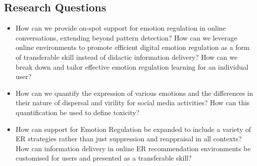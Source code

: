 \subsection{Research Questions}

\begin{itemize}
    \item How can we provide on-spot support for emotion regulation in online conversations, extending beyond pattern detection? How can we leverage online environments to promote efficient digital emotion regulation as a form of transferable skill instead of didactic information delivery? How can we break down and tailor effective emotion regulation learning for an individual user?
    \item How can we quantify the expression of various emotions and the differences in their nature of dispersal and virility for social media activities? How can this quantification be used to define toxicity?
    \item How can support for Emotion Regulation be expanded to include a variety of ER strategies rather than just suppression and reappraisal in all contexts? How can information delivery in online ER recommendation environments be customised for users and presented as a transferable skill?
\end{itemize}